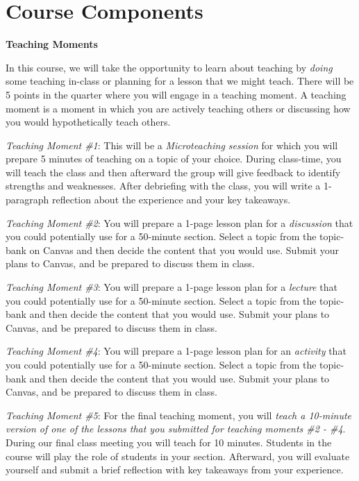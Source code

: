 \documentclass[11pt,]{article}
\begin{document}
\hypertarget{course-components}{%
\section{Course Components}\label{course-components}}

\textbf{Teaching Moments}

In this course, we will take the opportunity to learn about teaching by
\emph{doing} some teaching in-class or planning for a lesson that we
might teach. There will be 5 points in the quarter where you will engage
in a teaching moment. A teaching moment is a moment in which you are
actively teaching others or discussing how you would hypothetically
teach others.

\emph{Teaching Moment \#1}: This will be a \emph{Microteaching session}
for which you will prepare 5 minutes of teaching on a topic of your
choice. During class-time, you will teach the class and then afterward
the group will give feedback to identify strengths and weaknesses. After
debriefing with the class, you will write a 1-paragraph reflection about
the experience and your key takeaways.

\emph{Teaching Moment \#2}: You will prepare a 1-page lesson plan for a
\emph{discussion} that you could potentially use for a 50-minute
section. Select a topic from the topic-bank on Canvas and then decide
the content that you would use. Submit your plans to Canvas, and be
prepared to discuss them in class.

\emph{Teaching Moment \#3}: You will prepare a 1-page lesson plan for a
\emph{lecture} that you could potentially use for a 50-minute section.
Select a topic from the topic-bank and then decide the content that you
would use. Submit your plans to Canvas, and be prepared to discuss them
in class.

\emph{Teaching Moment \#4}: You will prepare a 1-page lesson plan for an
\emph{activity} that you could potentially use for a 50-minute section.
Select a topic from the topic-bank and then decide the content that you
would use. Submit your plans to Canvas, and be prepared to discuss them
in class.

\emph{Teaching Moment \#5}: For the final teaching moment, you will
\emph{teach a 10-minute version of one of the lessons that you submitted
for teaching moments \#2 - \#4}. During our final class meeting you will
teach for 10 minutes. Students in the course will play the role of
students in your section. Afterward, you will evaluate yourself and
submit a brief reflection with key takeaways from your experience.
\end{document}
